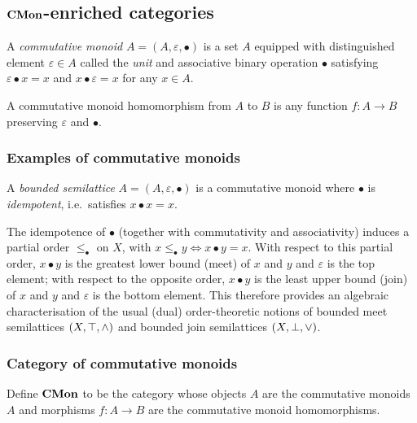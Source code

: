 \subsection{$\mathbf{CMon}$-enriched categories}
\label{sec:cmon-enriched}

\begin{definition}
A \emph{commutative monoid} $A = (A, \varepsilon, \bullet)$ is a set $A$ equipped with distinguished element
$\varepsilon \in A$ called the \emph{unit} and associative binary operation $\bullet$ satisfying $\varepsilon
\bullet x = x$ and $x \bullet \varepsilon = x$ for any $x \in A$.
\end{definition}

A commutative monoid homomorphism from $A$ to $B$ is any function $f: A \to B$ preserving $\varepsilon$ and
$\bullet$.

\subsubsection{Examples of commutative monoids}

\begin{definition}
\label{def:cmon-enriched:bounded-semilattice}
A \emph{bounded semilattice} $A = (A, \varepsilon, \bullet)$ is a commutative monoid where $\bullet$ is
\emph{idempotent}, i.e.~satisfies $x \bullet x = x$.
\end{definition}

\noindent The idempotence of $\bullet$ (together with commutativity and associativity) induces a partial order
$\le_\bullet$ on $X$, with $x \le_{\bullet} y \iff x \bullet y = x$. With respect to this partial order, $x
\bullet y$ is the greatest lower bound (meet) of $x$ and $y$ and $\varepsilon$ is the top element; with
respect to the opposite order, $x \bullet y$ is the least upper bound (join) of $x$ and $y$ and $\varepsilon$
is the bottom element. This therefore provides an algebraic characterisation of the usual (dual)
order-theoretic notions of bounded meet semilattices $(X, \top, \wedge)$ and bounded join semilattices $(X,
\bot, \vee)$.

\subsubsection{Category of commutative monoids}

\begin{definition}
Define $\mathbf{CMon}$ to be the category whose objects $A$ are the commutative monoids $A$ and morphisms $f: A \to B$
are the commutative monoid homomorphisms.
\end{definition}


